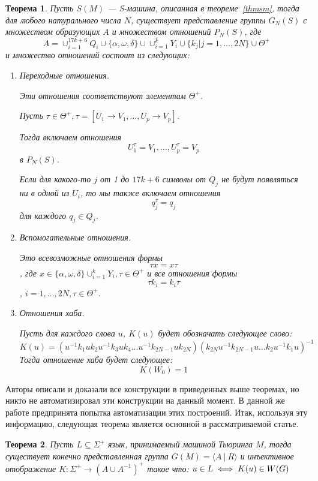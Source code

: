 \documentclass[14pt]{matmex-diploma-custom}
\newtheorem{thm}{Теорема}[subsection]
\begin{document}
\begin{thm} \label{sm2gr}
Пусть $ S (M) $ --- S-машина, описанная в теореме~\ref{thmsm},
тогда для любого натурального числа $ N $,
существует представление группы $ G_N (S) $
с множеством образующих $ A $ и множеством отношений $ P_N (S) $,
где
$$A = \cup^{17k+6}_{i=1} Q_i \cup \{\alpha, \omega, \delta\}
\cup \cup^k_{i=1}Y_i \cup \{k_j | j = 1, \dots, 2N\} \cup \Theta^+$$
и множество отношений состоит из следующих:
\begin{enumerate}
    \item Переходные отношения. 
    
    Эти отношения соответствуют элементам $\Theta^+$.
    
Пусть $\tau \in \Theta^+, \tau = [U_1 \to V_1, ..., U_p → V_p]$. 

Тогда включаем отношения 
$$U^{\tau}_1 = V_1, ..., U^{\tau}_p = V_p$$
в $P_N(S)$. 

Если для какого-то $j$ от 1 до $17k + 6$ символы от $Q_j$ не будут появляться ни в одной из $U_i$, 
то мы также включаем отношения 
$$q^{\tau}_j = q_j$$
для каждого $q_j \in Q_j$.
    \item Вспомогательные отношения.

Это всевозможные отношения формы 
$$\tau x = x \tau$$
, где 
$x \in \{\alpha, \omega, \delta\} \cup^k_{i=1} Y_i, \tau \in \Theta^+$ и все отношения формы 
$$\tau k_i = k_i\tau$$ 
, $i = 1, ..., 2N, \tau \in \Theta^+$.
    \item Отношения хаба.

Пусть для каждого слова $u$, $K(u)$ будет обозначать следующее слово:
$$K(u) = (u^{−1}k_1uk_2u^{−1}k_3uk_4 . . . u^{−1}k_{2N−1}uk_{2N})(k_{2N}u^{−1}k_{2N−1}u . . . k_2u^{−1}k_1u)^{−1}$$
Тогда отношение хаба будет следующее:
$$K(W_0) = 1$$
\end{enumerate}
\end{thm}

Авторы описали и доказали все конструкции в приведенных выше теоремах,
но никто не автоматизировал эти конструкции на данный момент. В данной же работе предпринята попытка автоматизации этих построений. Итак, используя эту информацию, следующая теорема является основной в рассматриваемой статье.

\begin{thm} \label{basethm}
Пусть $L \subseteq \Sigma^+$ язык, принимаемый машиной Тьюринга $M$,
    тогда существует конечно представленная группа $G(M)=\langle A~|~R \rangle$
    и инъективное отображение $K: \Sigma^+ \to (A \cup A^{-1})^+$ такое что:
    $\\u \in L \iff K(u)\in W(G)$
\end{thm}
\end{document}
